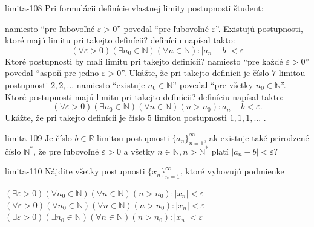 \begin{defproblem}{limita-108}
Pri formulácii definície vlastnej limity postupnosti študent:
\begin{tasks}
\task
    namiesto \enquote{pre ľubovoľné $\varepsilon > 0$} povedal \enquote{pre
    ľubovoľné $\varepsilon$}. Existujú postupnosti, ktoré majú limitu pri
    takejto definícii?
\task
    definíciu napísal takto:
    \[
        (\forall \varepsilon > 0)
            (\exists n_0 \in \mathbb{N})
                (\forall n \in \mathbb{N}):
                    |a_n - b| < \varepsilon
    \]
    Ktoré postupnosti by mali limitu pri takejto definícii?
\task
    namiesto \enquote{pre každé $\varepsilon > 0$} povedal \enquote{aspoň pre
    jedno $\varepsilon > 0$}. Ukážte, že pri takejto definícii je číslo $7$
    limitou postupnosti $2,2, ...$
\task
    namiesto \enquote{existuje $n_0 \in \mathbb{N}$} povedal \enquote{pre všetky
    $n_0 \in \mathbb{N}$}. Ktoré postupnosti majú limitu pri takejto definícii?
\task
    definíciu napísal takto:
    \[
        (\forall \varepsilon > 0)
            (\exists n_0 \in \mathbb{N})
                (\forall n \in \mathbb{N})
                    (n > n_0): a_n - b < \varepsilon.
    \]
    Ukážte, že pri takejto definícii je číslo $5$ limitou postupnosti $1,1,1,...$ .
\end{tasks}
\end{defproblem}

\begin{defproblem}{limita-109}
Je číslo $b \in \mathbb{R}$ limitou postupnosti ${\{a_n\}}_{n=1}^\infty$, ak
existuje také prirodzené číslo $\mathbb{N^*}$, že pre ľubovoľné $\varepsilon >
0$ a všetky $n \in \mathbb{N}, n > \mathbb{N^*}$ platí $|a_n-b|<\varepsilon$?
\end{defproblem}

\begin{defproblem}{limita-110}
Nájdite všetky postupnosti ${\{x_n\}}_{n=1}^\infty$, ktoré vyhovujú podmienke
\begin{tasks}
\task
    $(\exists \varepsilon > 0)
        (\forall n_0 \in \mathbb{N})
            (\forall n \in \mathbb{N})
                (n > n_0): |x_n| < \varepsilon
    $
\task
    $(\forall \varepsilon > 0)
        (\forall n_0 \in \mathbb{N})
            (\forall n \in \mathbb{N})
                (n > n_0): |x_n| < \varepsilon
    $
\task
    $(\exists \varepsilon > 0)
        (\exists n_0 \in \mathbb{N})
            (\forall n \in \mathbb{N})
                (n > n_0): |x_n| < \varepsilon
    $
\end{tasks}
\end{defproblem}

